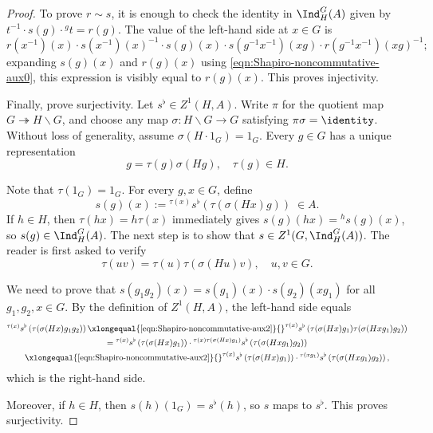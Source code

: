 \begin{proof}
	To prove $r\sim s$, it is enough to check the identity in
	$\Ind^G_H(A)$ given by $t^{-1}\cdot s(g)\cdot{}^gt=r(g)$. The value of
	the left-hand side at $x\in G$ is
	\[ r(x^{-1})(x) \cdot s(x^{-1})(x)^{-1} \cdot s(g)(x) \cdot s(g^{-1} x^{-1})(xg) \cdot r(g^{-1} x^{-1})(xg)^{-1}; \]
	expanding $s(g)(x)$ and $r(g)(x)$ using
	\eqref{eqn:Shapiro-noncommutative-aux0}, this expression is visibly equal
	to $r(g)(x)$. This proves injectivity.

	Finally, prove surjectivity. Let $s^\flat\in Z^1(H,A)$. Write $\pi$ for
	the quotient map $G\twoheadrightarrow H\backslash G$, and choose any map
	$\sigma:H\backslash G\to G$ satisfying $\pi\sigma=\identity$. Without
	loss of generality, assume $\sigma(H\cdot1_G)=1_G$. Every $g\in G$ has a
	unique representation
	\[ g = \tau(g) \sigma(Hg), \quad \tau(g) \in H. \]

	Note that $\tau(1_G)=1_G$. For every $g,x\in G$, define
	\[ s(g)(x) := {}^{\tau(x)} s^\flat\left( \tau(\sigma(Hx)g) \right) \; \in A. \]
	If $h\in H$, then $\tau(hx)=h\tau(x)$ immediately gives
	$s(g)(hx)={}^hs(g)(x)$, so $s(g)\in\Ind^G_H(A)$. The next step is to
	show that $s\in Z^1(G,\Ind^G_H(A))$. The reader is first asked to verify
	\begin{equation}\label{eqn:Shapiro-noncommutative-aux2}
		\tau(uv) = \tau(u) \tau(\sigma(Hu)v), \quad u, v \in G.
	\end{equation}

	We need to prove that
	$s(g_1g_2)(x)=s(g_1)(x)\cdot s(g_2)(xg_1)$ for all
	$g_1,g_2,x\in G$. By the definition of $Z^1(H,A)$, the left-hand side
	equals
	\begin{multline*}
		{}^{\tau(x)} s^\flat\left( \tau(\sigma(Hx)g_1 g_2) \right) \xlongequal{\text{\eqref{eqn:Shapiro-noncommutative-aux2}}} {}^{\tau(x)} s^\flat\left( \tau(\sigma(Hx)g_1) \tau(\sigma(Hx g_1)g_2) \right) \\
		= {}^{\tau(x)} s^\flat\left( \tau(\sigma(Hx)g_1) \right) \cdot {}^{\tau(x)\tau(\sigma(Hx)g_1)} s^\flat\left( \tau(\sigma(Hxg_1)g_2) \right) \\
		\xlongequal{\text{\eqref{eqn:Shapiro-noncommutative-aux2}}} {}^{\tau(x)} s^\flat\left( \tau(\sigma(Hx)g_1) \right) \cdot {}^{\tau(xg_1)} s^\flat\left( \tau(\sigma(Hxg_1)g_2) \right),
	\end{multline*}
	which is the right-hand side.

	Moreover, if $h\in H$, then $s(h)(1_G)=s^\flat(h)$, so $s$ maps to
	$s^\flat$. This proves surjectivity.
\end{proof}

